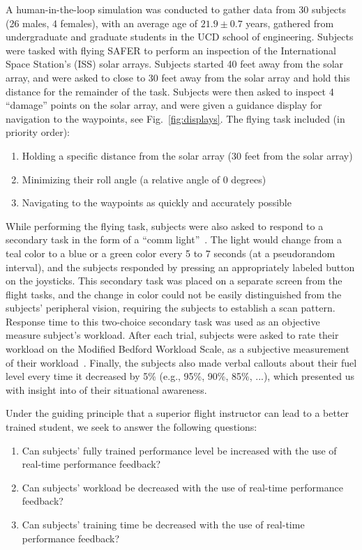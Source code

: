 \documentclass[]{aiaa-tc}%
\begin{document}
A human-in-the-loop simulation was conducted to gather data from 30 subjects (26 males, 4 females), with an average age of $21.9\pm0.7$ years, gathered from undergraduate and graduate students in the UCD school of engineering. Subjects were tasked with flying SAFER to perform an inspection of the International Space Station's (ISS) solar arrays. Subjects started 40 feet away from the solar array, and were asked to close to 30 feet away from the solar array and hold this distance for the remainder of the task. Subjects were then asked to inspect 4 ``damage'' points on the solar array, and were given a guidance display for navigation to the waypoints, see Fig.~\ref{fig:displays}. The flying task included (in priority order):
\begin{enumerate}
\item Holding a specific distance from the solar array (30 feet from the solar array)
\item Minimizing their roll angle (a relative angle of 0 degrees)
\item Navigating to the waypoints as quickly and accurately possible
\end{enumerate}

While performing the flying task, subjects were also asked to respond to a secondary task in the form of a ``comm light''~\cite{crosby1979dual, wickens1986sternberg, hainley2013pilot}. The light would change from a teal color to a blue or a green color every 5 to 7 seconds (at a pseudorandom interval), and the subjects responded by pressing an appropriately labeled button on the joysticks. This secondary task was placed on a separate screen from the flight tasks, and the change in color could not be easily distinguished from the subjects' peripheral vision, requiring the subjects to establish a scan pattern. Response time to this two-choice secondary task was used as an objective measure subject's workload. After each trial, subjects were asked to rate their workload on the Modified Bedford Workload Scale, as a subjective measurement of their workload~\cite{wickens1991processing}. Finally, the subjects also made verbal callouts about their fuel level every time it decreased by 5\% (e.g., 95\%, 90\%, 85\%, ...), which presented us with insight into of their situational awareness.


Under the guiding principle that a superior flight instructor can lead to a better trained student, we seek to answer the following questions:
\begin{enumerate}
\item Can subjects' fully trained performance level be increased with the use of real-time performance feedback?
\item Can subjects' workload be decreased with the use of real-time performance feedback?
\item Can subjects' training time be decreased with the use of real-time performance feedback?
\end{enumerate}
\end{document}
